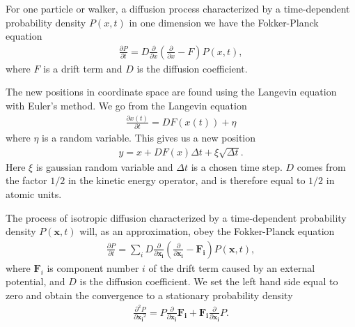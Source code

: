 \documentclass[11pt]{article}
\begin{document}
		For one particle or walker, a diffusion process characterized by a
		time-dependent probability density $P\left(x,t\right)$ in one dimension
		we have the Fokker-Planck equation
		\begin{align}
			\frac{\partial P}{\partial t}=D\frac{\partial}{\partial x}\left(\frac{\partial}{\partial x}-F\right)P\left(x,t\right),
		\end{align}
		where $F$ is a drift term and $D$ is the diffusion coefficient.

		The new positions in coordinate space are found using the Langevin
		equation with Euler's method. We go from the Langevin equation
		\begin{align}
			\frac{\partial x(t)}{\partial t}=DF(x(t))+\eta
		\end{align}
		where $\eta$ is a random variable. This gives us a new position
		\begin{align}
			y=x+DF(x)\Delta t+\xi\sqrt{\Delta t}.
		\end{align}
		Here $\xi$ is gaussian random variable and $\Delta t$ is a chosen
		time step. $D$ comes from the factor $1/2$ in the kinetic energy
		operator, and is therefore equal to $1/2$ in atomic units.

		The process of isotropic diffusion characterized by a time-dependent
		probability density $P\left(\mathbf{x},t\right)$ will, as an approximation,
		obey the Fokker-Planck equation
		\begin{align}
			\frac{\partial P}{\partial t}=\sum_{i}D\frac{\partial}{\partial\mathbf{x_{i}}}\left(\frac{\partial}{\partial\mathbf{x_{i}}}-\mathbf{F_{i}}\right)P(\mathbf{x},t),
		\end{align}
		where $\mathbf{F}_{i}$ is component number $i$ of the drift term
		caused by an external potential, and $D$ is the diffusion coefficient.
		We set the left hand side equal to zero and obtain the convergence
		to a stationary probability density
		\begin{align}
			\frac{\partial^{2}P}{\partial{\mathbf{x_{i}}^{2}}}=P\frac{\partial}{\partial{\mathbf{x_{i}}}}\mathbf{F_{i}}+\mathbf{F_{i}}\frac{\partial}{\partial{\mathbf{x_{i}}}}P.
		\end{align}
\end{document}

